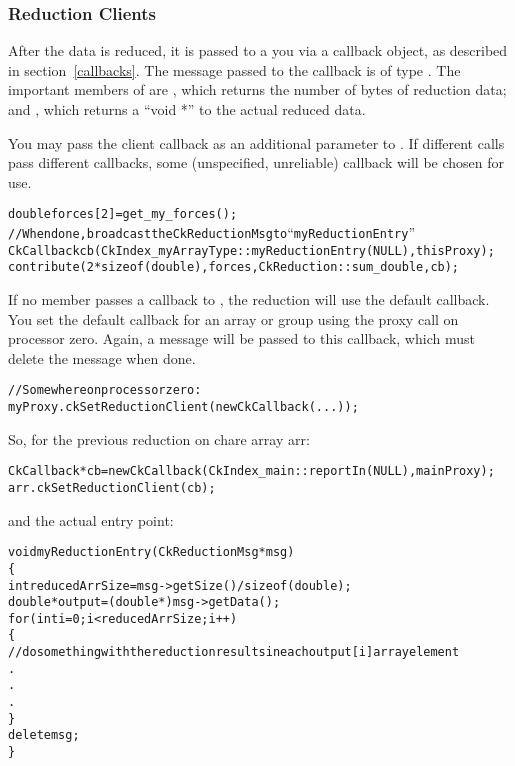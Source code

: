 \subsubsection{Reduction Clients}

\label{reductionClients}

After the data is reduced, it is passed to a you via a callback object,
as described in section~\ref{callbacks}.  The message passed to
the callback is of type .
The important members of  are
, which returns the number of bytes of reduction data; and
, which returns a ``void *'' to the actual reduced data.

You may pass the client callback as an additional parameter to .
If different  calls pass different callbacks, some (unspecified,
unreliable) callback will be chosen for use.
\begin{alltt}
    double forces[2]=get_my_forces();
    //When done, broadcast the CkReductionMsg to ``myReductionEntry''
    CkCallback cb(CkIndex_myArrayType::myReductionEntry(NULL), thisProxy);
    contribute(2*sizeof(double), forces,CkReduction::sum_double, cb);
\end{alltt}

If no member passes a callback to , the reduction will use
the default callback. You set the default callback for an array or group
using the  proxy call on processor zero.
Again, a  message will be passed to this callback,
which must delete the message when done.

\begin{alltt}
    //Somewhere on processor zero:
    myProxy.ckSetReductionClient(new CkCallback(...));
\end{alltt}

So, for the previous reduction on chare array arr:
\begin{alltt}
    CkCallback *cb = new CkCallback(CkIndex_main::reportIn(NULL),  mainProxy);
    arr.ckSetReductionClient(cb);
\end{alltt}

and the actual entry point:

\begin{alltt}
void myReductionEntry(CkReductionMsg *msg)
\{
  int reducedArrSize=msg->getSize() / sizeof(double);
  double *output=(double *) msg->getData();
  for(int i=0 ; i<reducedArrSize ; i++)
  \{
   // do something with the reduction results in each output[i] array element
   .
   .
   .
  \}
  delete msg;
\}
\end{alltt}

